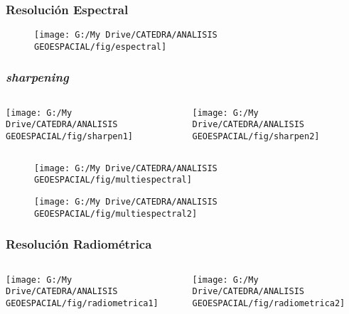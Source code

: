 \documentclass[14pt]{beamer}
\begin{document}
\begin{frame}
\frametitle{Resolución Espectral}
 \begin{figure}
    \centering
    \texttt{[image: G:/My Drive/CATEDRA/ANALISIS GEOESPACIAL/fig/espectral]}
  \end{figure}
\end{frame}
\begin{frame}
\frametitle{\emph{sharpening}}
  \begin{columns}
		\begin{column}{.7\linewidth}
		 \texttt{[image: G:/My Drive/CATEDRA/ANALISIS GEOESPACIAL/fig/sharpen1]}
		\end{column}
		\begin{column}{.3\linewidth}
\texttt{[image: G:/My Drive/CATEDRA/ANALISIS GEOESPACIAL/fig/sharpen2]}
		\end{column}
	\end{columns}
\end{frame}
\begin{frame}
 \begin{figure}
    \centering
    \texttt{[image: G:/My Drive/CATEDRA/ANALISIS GEOESPACIAL/fig/multiespectral]}
  \end{figure}
\end{frame}
\begin{frame}
 \begin{figure}
    \centering
    \texttt{[image: G:/My Drive/CATEDRA/ANALISIS GEOESPACIAL/fig/multiespectral2]}
  \end{figure}
\end{frame}
\begin{frame}
\frametitle{Resolución Radiométrica}
  \begin{columns}
		\begin{column}{.7\linewidth}
		 \texttt{[image: G:/My Drive/CATEDRA/ANALISIS GEOESPACIAL/fig/radiometrica1]}
		\end{column}
		\begin{column}{.3\linewidth}
\texttt{[image: G:/My Drive/CATEDRA/ANALISIS GEOESPACIAL/fig/radiometrica2]}
		\end{column}
	\end{columns}
\end{frame}
\end{document}
